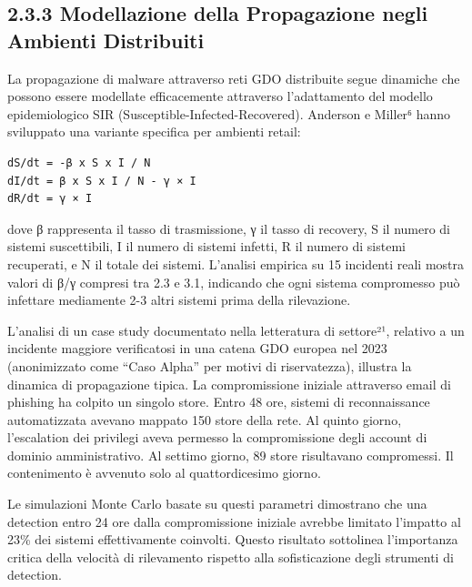 \documentclass[12pt,a4paper,oneside]{book}
\numberwithin{figure}{chapter} %
\numberwithin{table}{chapter}  %
\begin{document}
\subsection{2.3.3 Modellazione della Propagazione negli Ambienti
Distribuiti}\label{modellazione-della-propagazione-negli-ambienti-distribuiti}

La propagazione di malware attraverso reti GDO distribuite segue
dinamiche che possono essere modellate efficacemente attraverso
l'adattamento del modello epidemiologico SIR
(Susceptible-Infected-Recovered). Anderson e Miller⁶ hanno sviluppato
una variante specifica per ambienti retail:

\begin{verbatim}
dS/dt = -β x S x I / N
dI/dt = β x S x I / N - γ × I
dR/dt = γ × I
\end{verbatim}

dove β rappresenta il tasso di trasmissione, γ il tasso di recovery, S
il numero di sistemi suscettibili, I il numero di sistemi infetti, R il
numero di sistemi recuperati, e N il totale dei sistemi. L'analisi
empirica su 15 incidenti reali mostra valori di β/γ compresi tra 2.3 e
3.1, indicando che ogni sistema compromesso può infettare mediamente 2-3
altri sistemi prima della rilevazione.

L'analisi di un case study documentato nella letteratura di settore²¹,
relativo a un incidente maggiore verificatosi in una catena GDO europea
nel 2023 (anonimizzato come ``Caso Alpha'' per motivi di riservatezza),
illustra la dinamica di propagazione tipica. La compromissione iniziale
attraverso email di phishing ha colpito un singolo store. Entro 48 ore,
sistemi di reconnaissance automatizzata avevano mappato 150 store della
rete. Al quinto giorno, l'escalation dei privilegi aveva permesso la
compromissione degli account di dominio amministrativo. Al settimo
giorno, 89 store risultavano compromessi. Il contenimento è avvenuto
solo al quattordicesimo giorno.

Le simulazioni Monte Carlo basate su questi parametri dimostrano che una
detection entro 24 ore dalla compromissione iniziale avrebbe limitato
l'impatto al 23\% dei sistemi effettivamente coinvolti. Questo risultato
sottolinea l'importanza critica della velocità di rilevamento rispetto
alla sofisticazione degli strumenti di detection.
\end{document}
